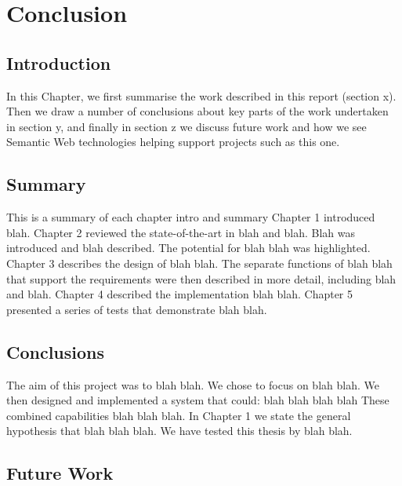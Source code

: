 \chapter{Conclusion} \label{c}

\section{Introduction} \label{c--introduction}

In this Chapter, we first summarise the work described in this report (section x). Then we draw a number of conclusions about key parts of the work undertaken in section y, and finally in section z we discuss future work and how we see Semantic Web technologies helping support projects such as this one.

\section{Summary} \label{c--summary}

This is a summary of each chapter  intro and summary
Chapter 1 introduced blah.
Chapter 2 reviewed the state-of-the-art in blah and blah.  Blah was introduced and blah described. The potential for blah blah was highlighted.
Chapter 3 describes the design of blah blah. The separate functions of blah blah that support the requirements were then described in more detail, including blah and blah.
Chapter 4 described the implementation blah blah.
Chapter 5 presented a series of tests that demonstrate blah blah.

\section{Conclusions} \label{c--conclusions}

The aim of this project was to blah blah.  We chose to focus on blah blah.
We then designed and implemented a system that could:
blah
blah
blah
blah
These combined capabilities blah blah blah.
In Chapter 1 we state the general hypothesis that blah blah blah. We have tested this thesis by blah blah.

\section{Future Work} \label{c--future-work}




